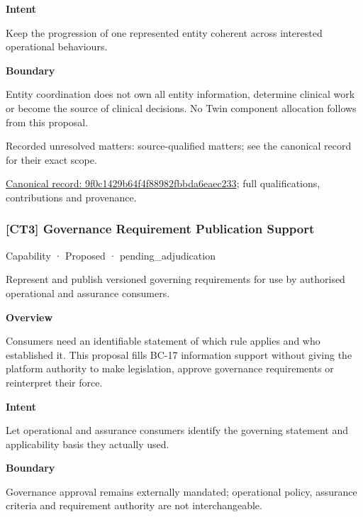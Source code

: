 \textbf{Intent}



Keep the progression of one represented entity coherent across interested operational behaviours.



\textbf{Boundary}



Entity coordination does not own all entity information, determine clinical work or become the source of clinical decisions. No Twin component allocation follows from this proposal.


{\small Recorded unresolved matters: source-qualified matters; see the canonical record for their exact scope.}\par
{\footnotesize \href{../../../../continuum/strategy/capability/9f0c1429b64f4f88982fbbda6eaec233.md}{Canonical record: 9f0c1429b64f4f88982fbbda6eaec233}; full qualifications, contributions and provenance.}\par
\subsubsection{[CT3] Governance Requirement Publication Support}

\label{element:7e780751d50e4ffe942f8443b7cb6567}
{\small Capability · Proposed · pending\_adjudication}\par

Represent and publish versioned governing requirements for use by authorised operational and assurance consumers.



\textbf{Overview}



Consumers need an identifiable statement of which rule applies and who established it. This proposal fills BC-17 information support without giving the platform authority to make legislation, approve governance requirements or reinterpret their force.



\textbf{Intent}



Let operational and assurance consumers identify the governing statement and applicability basis they actually used.



\textbf{Boundary}



Governance approval remains externally mandated; operational policy, assurance criteria and requirement authority are not interchangeable.


